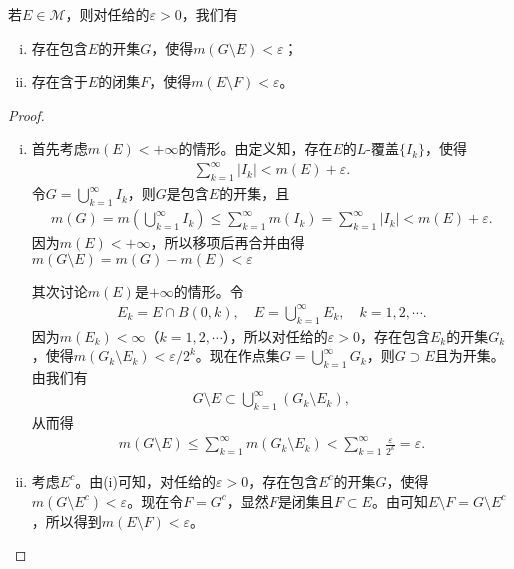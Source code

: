 \documentclass[../../main.tex]{subfiles}
\begin{document}
\begin{theorem}\label{theorem:定理2.13}
若$E\in\mathscr{M}$，则对任给的$\varepsilon > 0$，我们有
\begin{enumerate}[(i)]
\item 存在包含$E$的开集$G$，使得$m(G\setminus E)<\varepsilon$；
\item 存在含于$E$的闭集$F$，使得$m(E\setminus F)<\varepsilon$。
\end{enumerate}
\end{theorem}
\begin{proof}
\begin{enumerate}[(i)]
\item 首先考虑$m(E)<+\infty$的情形。由定义知，存在$E$的$L$-覆盖$\{I_k\}$，使得
\begin{align*}
\sum_{k = 1}^{\infty}|I_k|<m(E)+\varepsilon.
\end{align*}
令$G = \bigcup_{k = 1}^{\infty}I_k$，则$G$是包含$E$的开集，且
\begin{align*}
m\left( G \right) =m\left( \bigcup_{k=1}^{\infty}{I_k} \right) \leqslant \sum_{k=1}^{\infty}{m\left( I_k \right)}=\sum_{k=1}^{\infty}{\left| I_k \right|}<m(E)+\varepsilon .
\end{align*}
因为$m(E)<+\infty$，所以移项后再合并由得$m(G\setminus E)=m(G)-m(E)<\varepsilon$

其次讨论$m(E)$是$+\infty$的情形。令
\begin{align*}
E_k = E\cap B(0,k),\quad E=\bigcup_{k = 1}^{\infty}E_k,\quad k = 1,2,\cdots.
\end{align*}
因为$m(E_k)<\infty$（$k = 1,2,\cdots$），所以对任给的$\varepsilon>0$，存在包含$E_k$的开集$G_k$，使得$m(G_k\setminus E_k)<\varepsilon/2^k$。现在作点集$G = \bigcup_{k = 1}^{\infty}G_k$，则$G\supset E$且为开集。由我们有
\begin{align*}
G\setminus E\subset\bigcup_{k = 1}^{\infty}(G_k\setminus E_k),
\end{align*}
从而得
\begin{align*}
m(G\setminus E)\leqslant\sum_{k = 1}^{\infty}m(G_k\setminus E_k)<\sum_{k = 1}^{\infty}\frac{\varepsilon}{2^k}=\varepsilon.
\end{align*}
\item 考虑$E^c$。由(i)可知，对任给的$\varepsilon>0$，存在包含$E^c$的开集$G$，使得$m(G\setminus E^c)<\varepsilon$。现在令$F = G^c$，显然$F$是闭集且$F\subset E$。由可知$E\setminus F = G\setminus E^c$，所以得到$m(E\setminus F)<\varepsilon$。
\end{enumerate}
\end{proof}
\end{document}
